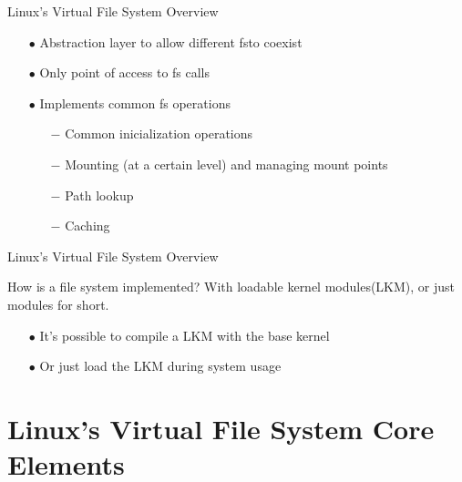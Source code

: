 \documentclass{beamer}
\begin{document}
\begin{frame}{Linux's Virtual File System Overview}

	\begin{itemize}[<+->]
	
		\item[$\bullet$]{Abstraction layer to allow different fs\footnotemark[1] to coexist}	
		\item[$\bullet$]{Only point of access to fs calls}
		\item[$\bullet$]{Implements common fs operations}
			\begin{itemize}
				\item[$-$]{Common inicialization operations}
				\item[$-$]{Mounting (at a certain level) and managing mount points}
				\item[$-$]{Path lookup}
				\item[$-$]{Caching}
			\end{itemize}	
	\end{itemize}


\end{frame}

\begin{frame}{Linux's Virtual File System Overview}

	\begin{block}{How is a file system implemented?}
		With loadable kernel modules\footnotemark[1] (LKM), or just modules for short.
	\end{block}

	\vspace{15pt}
	
	\pause

	\begin{itemize}[<+->]
	
		\item[$\bullet$]{It's possible to compile a LKM with the base kernel}
		\item[$\bullet$]{Or just load the LKM during system usage}

	\end{itemize}


\end{frame}

\section{Linux's Virtual File System Core Elements}
\end{document}
